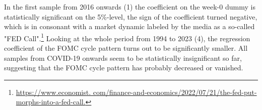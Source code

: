 
In the first sample from 2016 onwards (1) the coefficient on the week-0 dummy is statistically significant on the 5\%-level, the sign of the coefficient turned negative, which is in consonant with a market dynamic labeled by the media as a so-called "FED Call".\footnote{\url{https://www.economist. com/finance-and-economics/2022/07/21/the-fed-put-morphs-into-a-fed-call.}} Looking at the whole period from 1994 to 2023 (4), the regression coefficient of the FOMC cycle pattern turns out to be significantly smaller.  All samples from COVID-19 onwards seem to be statistically insignificant so far, suggesting that the FOMC cycle pattern has probably decreased or vanished.




